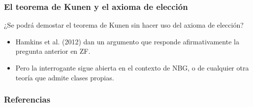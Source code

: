 \documentclass{beamer}
\begin{document}
\begin{frame}
    \frametitle{El teorema de Kunen y el axioma de elección}

    \pause
    ¿Se podrá demostar el teorema de Kunen sin hacer uso del axioma de elección?

    \begin{itemize}
        \pause
        \item Hamkins et al. (2012) dan un argumento que responde afirmativamente la pregunta
            anterior en ZF.
        \pause
        \item Pero la interrogante sigue abierta en el contexto de NBG, o de cualquier
            otra teoría que admite clases propias.
    \end{itemize}
\end{frame}

\begin{frame}
    \frametitle{Referencias}
    \nocite{kanamori_higher_2009}
    \nocite{jech_set_2003}
    \nocite{chang_model_2012}
    \nocite{hamkins_generalizations_2012}
    \printbibliography
\end{frame}
\end{document}
